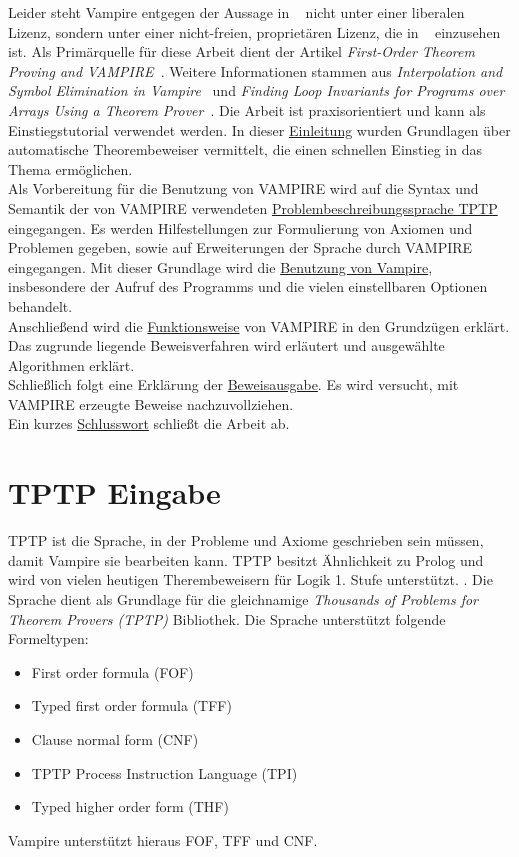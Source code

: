 \documentclass{article}
\begin{document}
Leider steht Vampire entgegen der Aussage in ~\cite{cav2013} nicht unter einer liberalen Lizenz, sondern unter einer nicht-freien, proprietären Lizenz, die in ~\cite{vampirehp} einzusehen ist.
Als Primärquelle für diese Arbeit dient der Artikel \textit{First-Order Theorem Proving and VAMPIRE}~\cite{cav2013}.
Weitere Informationen stammen aus \textit{Interpolation and Symbol Elimination in Vampire}~\cite{hoder2010} 
und \textit{Finding Loop Invariants for Programs over Arrays Using a Theorem Prover}~\cite{kovacs2009finding}.
Die Arbeit ist praxisorientiert und kann als Einstiegstutorial verwendet werden.
In dieser \hyperref[sec:introduction]{Einleitung} wurden Grundlagen über automatische Theorembeweiser vermittelt, die einen schnellen Einstieg in das Thema ermöglichen.\\
Als Vorbereitung für die Benutzung von VAMPIRE wird auf die Syntax und Semantik der von VAMPIRE verwendeten \hyperref[sec:input]{Problembeschreibungssprache TPTP} eingegangen. Es werden Hilfestellungen zur Formulierung von Axiomen und Problemen gegeben, sowie auf Erweiterungen der Sprache durch VAMPIRE eingegangen.
Mit dieser Grundlage wird die \hyperref[sec:invocation]{Benutzung von Vampire}, insbesondere der Aufruf des Programms und die vielen einstellbaren Optionen behandelt.\\
Anschließend wird die \hyperref[sec:mechanics]{Funktionsweise} von VAMPIRE in den Grundzügen erklärt. Das zugrunde liegende Beweisverfahren wird erläutert und ausgewählte Algorithmen erklärt.\\
Schließlich folgt eine Erklärung der \hyperref[sec:output]{Beweisausgabe}. Es wird versucht, mit VAMPIRE erzeugte Beweise nachzuvollziehen.\\
Ein kurzes \hyperref[sec:conclusion]{Schlusswort} schließt die Arbeit ab.



\section{TPTP Eingabe}
\label{sec:input}

TPTP ist die Sprache, in der Probleme und Axiome geschrieben sein müssen, damit Vampire sie bearbeiten kann. TPTP besitzt Ähnlichkeit zu Prolog und wird von vielen heutigen Therembeweisern für Logik 1. Stufe unterstützt. \cite[S. 4]{cav2013}. Die Sprache dient als Grundlage für die gleichnamige \textit{Thousands of Problems for Theorem Provers (TPTP)} Bibliothek. Die Sprache unterstützt folgende Formeltypen:
\begin{itemize}
	\item First order formula (FOF)
	\item Typed first order formula (TFF)
	\item Clause normal form (CNF)
	\item TPTP Process Instruction Language  (TPI)
	\item Typed higher order form (THF)
\end{itemize}
Vampire unterstützt hieraus FOF, TFF und CNF.
\end{document}
